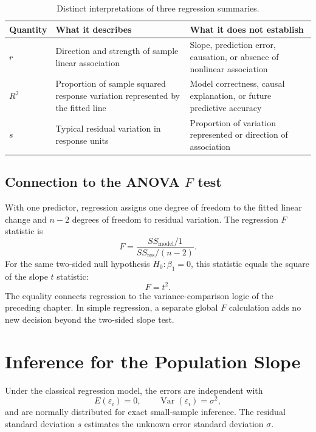 \begin{table}[htbp]
\centering
\caption{Distinct interpretations of three regression summaries.}
\label{tab:regression-summary-interpretations}
\begin{tabularx}{\textwidth}{@{}l>{\raggedright\arraybackslash}X>{\raggedright\arraybackslash}X@{}}
\toprule
Quantity & What it describes & What it does not establish \\
\midrule
$r$ & Direction and strength of sample linear association & Slope, prediction error, causation, or absence of nonlinear association \\
$R^2$ & Proportion of sample squared response variation represented by the fitted line & Model correctness, causal explanation, or future predictive accuracy \\
$s$ & Typical residual variation in response units & Proportion of variation represented or direction of association \\
\bottomrule
\end{tabularx}
\end{table}

\newpage
\subsection{Connection to the ANOVA $F$ test}

With one predictor, regression assigns one degree of freedom to the fitted linear change and $n-2$ degrees of freedom to residual variation. The regression $F$ statistic is
\[
F
=\frac{SS_{\text{model}}/1}{SS_{\text{res}}/(n-2)}.
\]
For the same two-sided null hypothesis $H_0:\beta_1=0$, this statistic equals the square of the slope $t$ statistic:
\[
F=t^2.
\]
The equality connects regression to the variance-comparison logic of the preceding chapter. In simple regression, a separate global $F$ calculation adds no new decision beyond the two-sided slope test.

\section{Inference for the Population Slope}
\label{sec:regression-slope-inference}

Under the classical regression model, the errors are independent with
\[
E(\varepsilon_i)=0,
\qquad
\operatorname{Var}(\varepsilon_i)=\sigma^2,
\]
and are normally distributed for exact small-sample inference. The residual standard deviation $s$ estimates the unknown error standard deviation $\sigma$.

